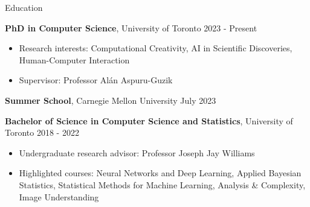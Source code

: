 \documentclass{resume} %
\begin{document}
\begin{rSection}{Education}

    \textbf{PhD in Computer Science}, University of Toronto \hfill {2023 - Present}
    \begin{itemize}
        \item Research interests: Computational Creativity, AI in Scientific Discoveries, Human-Computer Interaction
        \item Supervisor: Professor Alán Aspuru-Guzik
    \end{itemize}
    
    \textbf{Summer School}, Carnegie Mellon University \hfill {July 2023}
    
    \textbf{Bachelor of Science in Computer Science and Statistics}, University of Toronto \hfill {2018 - 2022}
    \begin{itemize}
        \item Undergraduate research advisor: Professor Joseph Jay Williams
        \item Highlighted courses: Neural Networks and Deep Learning, Applied Bayesian Statistics, Statistical Methods for Machine Learning, Analysis \& Complexity, Image Understanding
    \end{itemize}

\end{rSection}
\end{document}
